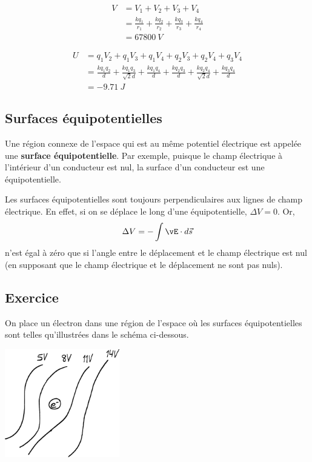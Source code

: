 \begin{align*}
  V &= V_1 + V_2 + V_3 + V_4 \\
    &= \frac{kq_1}{r_1} + \frac{kq_2}{r_2} + \frac{kq_3}{r_3} +
    \frac{kq_4}{r_4} \\
    &= \SI{67800}{V}
\end{align*}

\begin{align*}
  U &= q_1 V_2 + q_1 V_3 + q_1 V_4 + q_2 V_3 + q_2 V_4 + q_3 V_4 \\
    &= \frac{kq_1 q_2}{d} + \frac{kq_1 q_3}{\sqrt{2}d} + \frac{kq_1 q_4}{d} +
    \frac{kq_2 q_3}{d} + \frac{kq_2q_4}{\sqrt{2} d} + \frac{kq_3q_4}{d} \\
    &= \SI{-9.71}{J}
\end{align*}



\subsection*{Surfaces équipotentielles}

Une région connexe de l'espace qui est au même potentiel électrique est appelée
une \textbf{surface équipotentielle}. Par exemple, puisque le champ électrique
à l'intérieur d'un conducteur est nul, la surface d'un conducteur est une
équipotentielle.

Les surfaces équipotentielles sont toujours perpendiculaires aux lignes de
champ électrique. En effet, si on se déplace le long d'une équipotentielle,
$\Delta V = 0$. Or,
\[
  \Delta V = - \int \vE \cdot d\vec{s}
\]
n'est égal à zéro que si l'angle entre le déplacement et le champ électrique
est nul (en supposant que le champ électrique et le déplacement ne sont pas
nuls).



\subsection*{Exercice}


On place un électron dans une région de l'espace où les surfaces
équipotentielles sont telles qu'illustrées dans le schéma ci-dessous.

\begin{center}
  \includegraphics[width=5cm]{04-potentiel/figures/exercice-equipotentielles.pdf}
\end{center}

